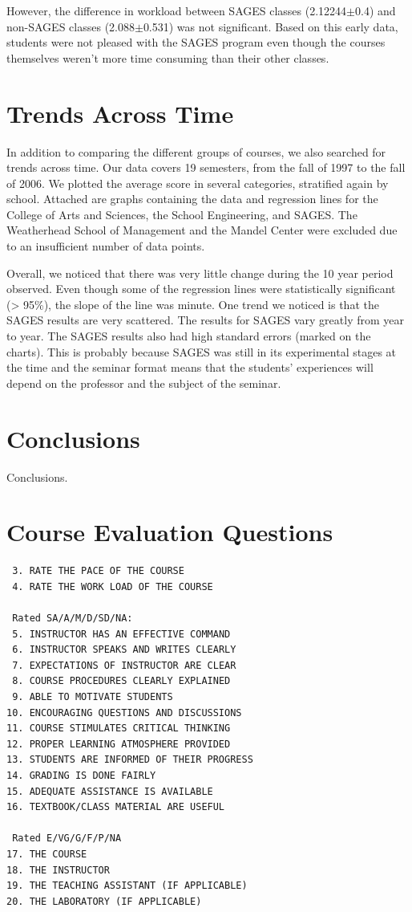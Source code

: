 \documentclass[12pt]{article}
\begin{document}
However, the difference in workload between SAGES classes (2.12244$\pm$0.4) and non-SAGES classes (2.088$\pm$0.531) was not significant. Based on this early data, students were not pleased with the SAGES program even though the courses themselves weren't more time consuming than their other classes.

\section{Trends Across Time}
In addition to comparing the different groups of courses, we also searched for trends across time. Our data covers 19 semesters, from the fall of 1997 to the fall of 2006. We plotted the average score in several categories, stratified again by school. Attached are graphs containing the data and regression lines for the College of Arts and Sciences, the School Engineering, and SAGES. The Weatherhead School of Management and the Mandel Center were excluded due to an insufficient number of data points.

Overall, we noticed that there was very little change during the 10 year period observed. Even though some of the regression lines were statistically significant (> 95\%), the slope of the line was minute. One trend we noticed is that the SAGES results are very scattered. The results for SAGES vary greatly from year to year. The SAGES results also had high standard errors (marked on the charts). This is probably because SAGES was still in its experimental stages at the time and the seminar format means that the students' experiences will depend on the professor and the subject of the seminar.

\section{Conclusions}\label{conclusions}
Conclusions.

\appendix

\section{Course Evaluation Questions}
\begin{verbatim}
 3. RATE THE PACE OF THE COURSE 
 4. RATE THE WORK LOAD OF THE COURSE
 
 Rated SA/A/M/D/SD/NA:
 5. INSTRUCTOR HAS AN EFFECTIVE COMMAND
 6. INSTRUCTOR SPEAKS AND WRITES CLEARLY
 7. EXPECTATIONS OF INSTRUCTOR ARE CLEAR
 8. COURSE PROCEDURES CLEARLY EXPLAINED
 9. ABLE TO MOTIVATE STUDENTS
10. ENCOURAGING QUESTIONS AND DISCUSSIONS
11. COURSE STIMULATES CRITICAL THINKING
12. PROPER LEARNING ATMOSPHERE PROVIDED
13. STUDENTS ARE INFORMED OF THEIR PROGRESS
14. GRADING IS DONE FAIRLY
15. ADEQUATE ASSISTANCE IS AVAILABLE
16. TEXTBOOK/CLASS MATERIAL ARE USEFUL

 Rated E/VG/G/F/P/NA
17. THE COURSE
18. THE INSTRUCTOR
19. THE TEACHING ASSISTANT (IF APPLICABLE)
20. THE LABORATORY (IF APPLICABLE)
\end{verbatim}
\end{document}
